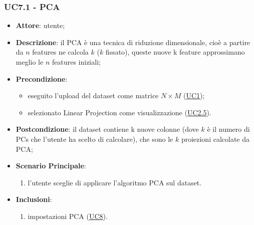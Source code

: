     \subsubsection{UC7.1 - PCA}
    \label{uc7.1}
    \begin{itemize}
    \item \textbf{Attore}: utente;
    \item \textbf{Descrizione}: il PCA è una tecnica di riduzione dimensionale, cioè a partire da $n$ features ne calcola $k$ ($k$ fissato), queste nuove k feature approssimano meglio le $n$ features iniziali;
    \item \textbf{Precondizione}: 
    \begin{itemize}
        \item eseguito l'upload del dataset come matrice $N\times M$ (\hyperref[uc1]{UC1});
        \item selezionato Linear Projection come visualizzazione (\hyperref[uc2.5]{UC2.5}).
    \end{itemize}  
    \item \textbf{Postcondizione}: il dataset contiene k nuove colonne (dove $k$ è il numero di PCs che l'utente ha scelto di calcolare), che sono le $k$ proiezioni calcolate da PCA;
    \item \textbf{Scenario Principale}: 
    \begin{enumerate}
        \item l'utente sceglie di applicare l'algoritmo PCA sul dataset.
    \end{enumerate}  
    \item \textbf{Inclusioni}:
        \begin{enumerate}
            \item impostazioni PCA (\hyperref[uc8]{UC8}).
        \end{enumerate} 
    \end{itemize}
    
    
